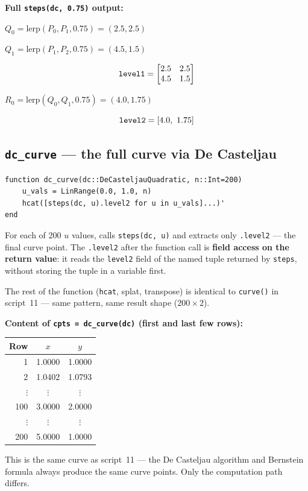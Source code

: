 \documentclass[12pt, a4paper]{article}
\newcommand{\cd}[1]{\texttt{#1}}
\begin{document}
\begin{examplebox}
\textbf{Full \cd{steps(dc, 0.75)} output:}

$Q_0 = \text{lerp}(P_0, P_1, 0.75) = (2.5, 2.5)$

$Q_1 = \text{lerp}(P_1, P_2, 0.75) = (4.5, 1.5)$

\[
  \text{\cd{level1}} =
  \begin{bmatrix} 2.5 & 2.5 \\ 4.5 & 1.5 \end{bmatrix}
\]

$R_0 = \text{lerp}(Q_0, Q_1, 0.75) = (4.0, 1.75)$

\[
  \text{\cd{level2}} = [4.0,\ 1.75]
\]
\end{examplebox}

\subsection{\texttt{dc\_curve} --- the full curve via De Casteljau}

\begin{verbatim}
function dc_curve(dc::DeCasteljauQuadratic, n::Int=200)
    u_vals = LinRange(0.0, 1.0, n)
    hcat([steps(dc, u).level2 for u in u_vals]...)'
end
\end{verbatim}

For each of 200 $u$ values, calls \cd{steps(dc, u)} and
extracts only \cd{.level2} --- the final curve point.
The \cd{.level2} after the function call is
\textbf{field access on the return value}:
it reads the \cd{level2} field of the named tuple
returned by \cd{steps}, without storing the tuple in
a variable first.

The rest of the function (\cd{hcat}, splat, transpose)
is identical to \cd{curve()} in script~11 ---
same pattern, same result shape ($200 \times 2$).

\begin{examplebox}
\textbf{Content of \cd{cpts = dc\_curve(dc)} (first and last few rows):}

\medskip
\begin{center}
\begin{tabular}{rcc}
\toprule
Row & $x$ & $y$ \\
\midrule
1   & 1.0000 & 1.0000 \\
2   & 1.0402 & 1.0793 \\
$\vdots$ & $\vdots$ & $\vdots$ \\
100 & 3.0000 & 2.0000 \\
$\vdots$ & $\vdots$ & $\vdots$ \\
200 & 5.0000 & 1.0000 \\
\bottomrule
\end{tabular}
\end{center}

This is the same curve as script~11 --- the De Casteljau
algorithm and Bernstein formula always produce the same
curve points. Only the computation path differs.
\end{examplebox}
\end{document}
